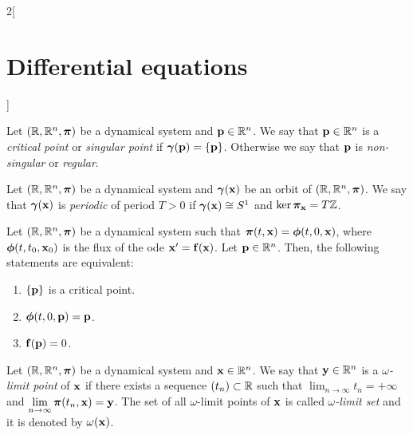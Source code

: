 \documentclass[../../../main.tex]{subfiles}
\begin{document}
\begin{multicols}{2}[\section{Differential equations}]
\begin{prop}
\begin{enumerate}
    \end{enumerate}
  \end{prop}
  \begin{definition}
    Let $(\mathbb{R},\mathbb{R}^n,\boldsymbol{\mathrm{\pi}})$ be a dynamical system and $\boldsymbol{\mathrm{p}}\in\mathbb{R}^n$. We say that $\boldsymbol{\mathrm{p}}\in\mathbb{R}^n$ is a \textit{critical point} or \textit{singular point} if $\boldsymbol{\mathrm{\gamma}}(\boldsymbol{\mathrm{p}})=\{\boldsymbol{\mathrm{p}}\}$. Otherwise we say that $\boldsymbol{\mathrm{p}}$ is \textit{non-singular} or \textit{regular}.
  \end{definition}
  \begin{definition}
    Let $(\mathbb{R},\mathbb{R}^n,\boldsymbol{\mathrm{\pi}})$ be a dynamical system and $\boldsymbol{\mathrm{\gamma}}(\boldsymbol{\mathrm{x}})$ be an orbit of $(\mathbb{R},\mathbb{R}^n,\boldsymbol{\mathrm{\pi}})$. We say that $\boldsymbol{\mathrm{\gamma}}(\boldsymbol{\mathrm{x}})$ is \textit{periodic} of period $T>0$ if $\boldsymbol{\mathrm{\gamma}}(\boldsymbol{\mathrm{x}})\cong S^1$ and $\ker\boldsymbol{\mathrm{\pi_{\boldsymbol{\mathrm{x}}}}}=T\mathbb{Z}$.
  \end{definition}
  \begin{prop}
    Let $(\mathbb{R},\mathbb{R}^n,\boldsymbol{\mathrm{\pi}})$ be a dynamical system such that $\boldsymbol{\mathrm{\pi}}(t,\boldsymbol{\mathrm{x}})=\boldsymbol{\mathrm{\phi}}(t,0,\boldsymbol{\mathrm{x}})$, where $\boldsymbol{\mathrm{\phi}}(t,t_0,\boldsymbol{\mathrm{x}}_0)$ is the flux of the ode $\boldsymbol{\mathrm{x}}' =\boldsymbol{\mathrm{f}}(\boldsymbol{\mathrm{x}})$. Let $\boldsymbol{\mathrm{p}}\in\mathbb{R}^n$. Then, the following statements are equivalent:
    \begin{enumerate}
      \item $\{\boldsymbol{\mathrm{p}}\}$ is a critical point.
      \item $\boldsymbol{\mathrm{\phi}}(t,0,\boldsymbol{\mathrm{p}})=\boldsymbol{\mathrm{p}}$.
      \item $\boldsymbol{\mathrm{f}}(\boldsymbol{\mathrm{p}})=0$.
    \end{enumerate}
  \end{prop}
  \begin{definition}
    Let $(\mathbb{R},\mathbb{R}^n,\boldsymbol{\mathrm{\pi}})$ be a dynamical system and $\boldsymbol{\mathrm{x}}\in\mathbb{R}^n$. We say that $\boldsymbol{\mathrm{y}}\in\mathbb{R}^n$ is a \textit{$\omega$-limit point} of $\boldsymbol{\mathrm{x}}$ if there exists a sequence $(t_n)\subset\mathbb{R}$ such that $\displaystyle\lim_{n\to\infty}t_n=+\infty$ and $\displaystyle\lim_{n\to\infty}\boldsymbol{\mathrm{\pi}}(t_n,\boldsymbol{\mathrm{x}})=\boldsymbol{\mathrm{y}}$.
    The set of all $\omega$-limit points of $\boldsymbol{\mathrm{x}}$ is called \textit{$\omega$-limit set} and it is denoted by $\omega(\boldsymbol{\mathrm{x}})$.

\end{definition}
\end{multicols}
\end{document}
